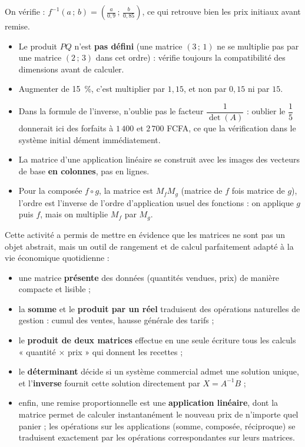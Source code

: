 \documentclass[11pt]{article}
\newcommand{\cle}[1]{{\popxbold\color{popdark}#1}}
\newcounter{popsec}
\newcounter{popsub}
\newcommand{\courssub}[1]{%
  \stepcounter{popsub}%
  \par\vspace{9pt}\noindent{\popxbold\fontsize{11.5}{13}\selectfont\color{popink}{\color{poporange}\thepopsec.\thepopsub}\hspace{6pt}#1}\par\nopagebreak\vspace{4pt}
}
\begin{document}
\begin{exemplebox}
\begin{enumerate}
On vérifie : $f^{-1}(a\,;\,b) = \left(\frac{a}{0{,}9}\,;\,\frac{b}{0{,}85}\right)$, ce qui retrouve bien les prix initiaux avant remise.
\end{enumerate}
\end{exemplebox}

\begin{attention}
\begin{itemize}
\item Le produit $PQ$ n'est \textbf{pas défini} (une matrice $(3\,;\,1)$ ne se multiplie pas par une matrice $(2\,;\,3)$ dans cet ordre) : vérifie toujours la compatibilité des dimensions avant de calculer.
\item Augmenter de \SI{15}{\percent}, c'est multiplier par $1{,}15$, et non par $0{,}15$ ni par $15$.
\item Dans la formule de l'inverse, n'oublie pas le facteur $\dfrac{1}{\det(A)}$ : oublier le $\dfrac{1}{5}$ donnerait ici des forfaits à $1\,400$ et $2\,700$ FCFA, ce que la vérification dans le système initial dément immédiatement.
\item La matrice d'une application linéaire se construit avec les images des vecteurs de base \textbf{en colonnes}, pas en lignes.
\item Pour la composée $f \circ g$, la matrice est $M_f M_g$ (matrice de $f$ fois matrice de $g$), l'ordre est l'inverse de l'ordre d'application usuel des fonctions : on applique $g$ puis $f$, mais on multiplie $M_f$ par $M_g$.
\end{itemize}
\end{attention}

\courssub{Bilan de l'activité}

Cette activité a permis de mettre en évidence que les matrices ne sont pas un objet abstrait, mais un \cle{outil de rangement et de calcul} parfaitement adapté à la vie économique quotidienne :

\begin{itemize}
\item une matrice \textbf{présente} des données (quantités vendues, prix) de manière compacte et lisible ;
\item la \textbf{somme} et le \textbf{produit par un réel} traduisent des opérations naturelles de gestion : cumul des ventes, hausse générale des tarifs ;
\item le \textbf{produit de deux matrices} effectue en une seule écriture tous les calculs « quantité $\times$ prix » qui donnent les recettes ;
\item le \textbf{déterminant} décide si un système commercial admet une solution unique, et l'\textbf{inverse} fournit cette solution directement par $X=A^{-1}B$ ;
\item enfin, une remise proportionnelle est une \textbf{application linéaire}, dont la matrice permet de calculer instantanément le nouveau prix de n'importe quel panier ; les opérations sur les applications (somme, composée, réciproque) se traduisent exactement par les opérations correspondantes sur leurs matrices.
\end{itemize}
\end{document}
